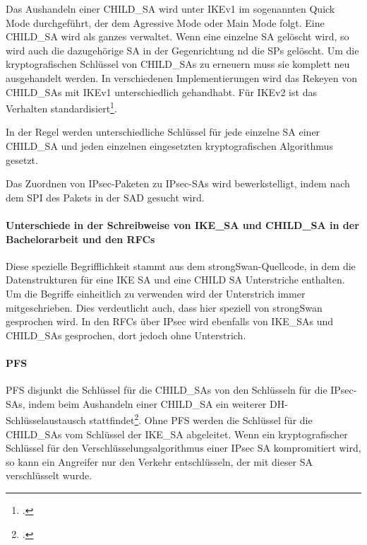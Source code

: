Das Aushandeln einer CHILD\_SA wird unter IKEv1 im sogenannten Quick Mode durchgeführt, der dem Agressive Mode
oder Main Mode folgt.
Eine CHILD\_SA wird als ganzes verwaltet. Wenn eine einzelne \ac{SA} gelöscht wird, so wird
auch die dazugehörige \ac{SA} in der Gegenrichtung nd die \acp{SP} gelöscht.
Um die kryptografischen Schlüssel von CHILD\_SAs zu erneuern muss sie komplett neu ausgehandelt werden.
In verschiedenen Implementierungen wird das Rekeyen von CHILD\_SAs mit IKEv1 unterschiedlich gehandhabt.
Für IKEv2 ist das Verhalten standardisiert\footcite[][16]{charlie_kaufman_rfc_2014}.

In der Regel werden unterschiedliche Schlüssel für jede einzelne SA einer CHILD\_SA
und jeden einzelnen eingesetzten kryptografischen Algorithmus gesetzt.

Das Zuordnen von \ac{IPsec}-Paketen zu \ac{IPsec}-\acp{SA} wird bewerkstelligt,
indem nach dem \ac{SPI} des Pakets in der \ac{SAD} gesucht wird.

\paragraph{Unterschiede in der Schreibweise von IKE\_SA und CHILD\_SA in der Bachelorarbeit und den RFCs}
Diese spezielle Begrifflichkeit stammt aus dem strongSwan-Quellcode, in dem
die Datenstrukturen für eine IKE SA und eine CHILD SA Unterstriche enthalten.
Um die Begriffe einheitlich zu verwenden wird der Unterstrich immer mitgeschrieben.
Dies verdeutlicht auch, dass hier speziell von strongSwan gesprochen wird.
In den \acp{RFC} über \ac{IPsec} wird ebenfalls von IKE\_SAs und CHILD\_SAs gesprochen,
dort jedoch ohne Unterstrich.

\paragraph{PFS}
\ac{PFS} disjunkt die Schlüssel für die CHILD\_SAs von den Schlüsseln
für die \ac{IPsec}-\acp{SA}, indem beim Aushandeln einer CHILD\_SA ein weiterer
\ac{DH}-Schlüsselaustausch stattfindet\footcite[13]{charlie_kaufman_rfc_2014}.
Ohne \ac{PFS} werden die Schlüssel für die CHILD\_SAs vom Schlüssel der IKE\_SA
abgeleitet. Wenn ein kryptografischer Schlüssel für den Verschlüsselungsalgorithmus
einer \ac{IPsec} \ac{SA} kompromitiert wird, so kann ein Angreifer nur den Verkehr entschlüsseln,
der mit dieser \ac{SA} verschlüsselt wurde.

